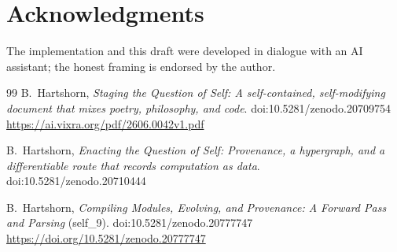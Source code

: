 \documentclass[11pt]{article}
\begin{document}
\section*{Acknowledgments}
The implementation and this draft were developed in dialogue with an AI assistant;
the honest framing is endorsed by the author.

\begin{thebibliography}{99}
 B.~Hartshorn, \emph{Staging the Question of Self: A
self-contained, self-modifying document that mixes poetry, philosophy, and code}.
doi:10.5281/zenodo.20709754
\newline \url{https://ai.vixra.org/pdf/2606.0042v1.pdf}

 B.~Hartshorn, \emph{Enacting the Question of Self: Provenance, a
hypergraph, and a differentiable route that records computation as data}.
doi:10.5281/zenodo.20710444

 B.~Hartshorn, \emph{Compiling Modules, Evolving, and Provenance: A
Forward Pass and Parsing} (self\_9). doi:10.5281/zenodo.20777747
\newline \url{https://doi.org/10.5281/zenodo.20777747}


\end{thebibliography}
\end{document}
